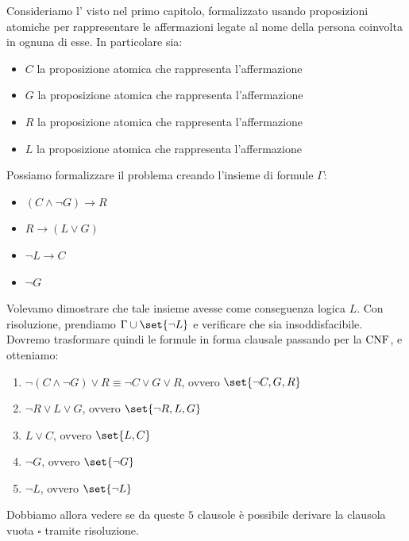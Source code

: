 \begin{example}{}
  Consideriamo l' visto nel primo capitolo, formalizzato usando proposizioni atomiche per rappresentare le affermazioni legate al nome della persona coinvolta in ognuna di esse. In particolare sia:

  \begin{itemize}
    \item \(C\) la proposizione atomica che rappresenta l'affermazione 
    \item \(G\) la proposizione atomica che rappresenta l'affermazione 
    \item \(R\) la proposizione atomica che rappresenta l'affermazione 
    \item \(L\) la proposizione atomica che rappresenta l'affermazione 
  \end{itemize}

  Possiamo formalizzare il problema creando l'insieme di formule \(\Gamma\):
  \begin{itemize}
    \item \((C\land \neg G)\to R\)
    \item \(R \to (L\lor G)\)
    \item \(\neg L \to C\)
    \item \(\neg G\)
  \end{itemize}

  Volevamo dimostrare che tale insieme avesse come conseguenza logica \(L\).
  Con risoluzione, prendiamo \(\Gamma \cup \set{\neg L}\) e verificare che sia insoddisfacibile.
  Dovremo trasformare quindi le formule in forma clausale passando per la \(\operatorname{CNF}\), e otteniamo:
  \begin{enumerate}
    \item \(\neg(C\land\neg G) \lor R \equiv \neg C \lor G \lor R\), ovvero \(\set{\neg C,G,R}\)
    \item \(\neg R \lor L \lor G\), ovvero \(\set{\neg R, L, G}\)
    \item \(L \lor C\), ovvero \(\set{L, C}\)
    \item \(\neg G\), ovvero \(\set{\neg G}\)
    \item \(\neg L\), ovvero \(\set{\neg L}\)
  \end{enumerate}

  Dobbiamo allora vedere se da queste \(5\) clausole è possibile derivare la clausola vuota \(\square\) tramite risoluzione.


\end{example}

